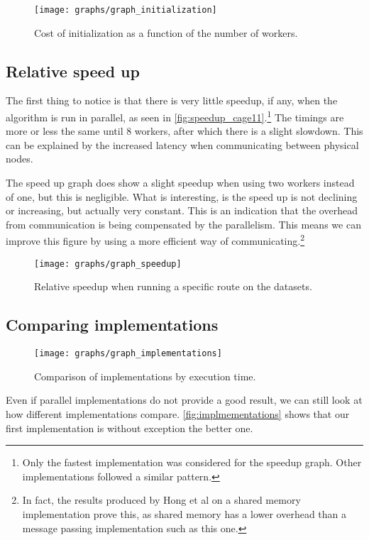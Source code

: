 \begin{figure}
	\texttt{[image: graphs/graph\_initialization]}
  \caption{Cost of initialization as a function of the number of workers.}
  \label{fig:initialization_time}
\end{figure}

\subsection{Relative speed up}
The first thing to notice is that there is very little speedup, if any, when the algorithm is run in parallel, as seen in \autoref{fig:speedup_cage11}.\footnote{Only the fastest implementation was considered for the speedup graph. Other implementations followed a similar pattern.} The timings are more or less the same until 8 workers, after which there is a slight slowdown. This can be explained by the increased latency when communicating between physical nodes.

The speed up graph does show a slight speedup when using two workers instead of one, but this is negligible. What is interesting, is the speed up is not declining or increasing, but actually very constant. This is an indication that the overhead from communication is being compensated by the parallelism. This means we can improve this figure by using a more efficient way of communicating.\footnote{In fact, the results produced by Hong et al \cite{LockFreeMultithreadedMaxFlow} on a shared memory implementation prove this, as shared memory has a lower overhead than a message passing implementation such as this one.}

\begin{figure}
  \texttt{[image: graphs/graph\_speedup]}
  \caption{Relative speedup when running a specific route on the datasets.}
  \label{fig:speedup_cage11}
\end{figure}

\subsection{Comparing implementations}

\begin{figure}
  \texttt{[image: graphs/graph\_implementations]}
  \caption{Comparison of implementations by execution time.}
  \label{fig:implmementations}
\end{figure}

Even if parallel implementations do not provide a good result, we can still look at how different implementations compare. \autoref{fig:implmementations} shows that our first implementation is without exception the better one.
